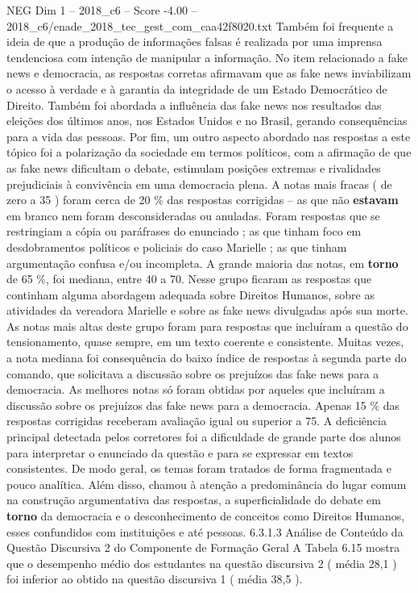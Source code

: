 \begin{textsample}{NEG Dim 1 – 2018\_c6 – Score -4.00 – 2018\_c6/enade\_2018\_tec\_gest\_com\_caa42f8020.txt}
Também foi frequente a ideia de que a produção de informações falsas é realizada por uma imprensa tendenciosa com intenção de manipular a informação.
No item relacionado a fake news e democracia, as respostas corretas afirmavam que as fake news inviabilizam o acesso à verdade e à garantia da integridade de um Estado Democrático de Direito.
Também foi abordada a influência das fake news nos resultados das eleições dos últimos anos, nos Estados Unidos e no Brasil, gerando consequências para a vida das pessoas.
Por fim, um outro aspecto abordado nas respostas a este tópico foi a polarização da sociedade em termos políticos, com a afirmação de que as fake news dificultam o debate, estimulam posições extremas e rivalidades prejudiciais à convivência em uma democracia plena.
A notas mais fracas ( de zero a 35 ) foram cerca de 20 \% das respostas corrigidas – as que não \textbf{estavam} em branco nem foram desconsideradas ou anuladas.
Foram respostas que se restringiam a cópia ou paráfrases do enunciado ; as que tinham foco em desdobramentos políticos e policiais do caso Marielle ; as que tinham argumentação confusa e/ou incompleta.
A grande maioria das notas, em \textbf{torno} de 65 \%, foi mediana, entre 40 a 70.
Nesse grupo ficaram as respostas que continham alguma abordagem adequada sobre Direitos Humanos, sobre as atividades da vereadora Marielle e sobre as fake news divulgadas após sua morte.
As notas mais altas deste grupo foram para respostas que incluíram a questão do tensionamento, quase sempre, em um texto coerente e consistente.
Muitas vezes, a nota mediana foi consequência do baixo índice de respostas à segunda parte do comando, que solicitava a discussão sobre os prejuízos das fake news para a democracia.
As melhores notas só foram obtidas por aqueles que incluíram a discussão sobre os prejuízos das fake news para a democracia.
Apenas 15 \% das respostas corrigidas receberam avaliação igual ou superior a 75.
A deficiência principal detectada pelos corretores foi a dificuldade de grande parte dos alunos para interpretar o enunciado da questão e para se expressar em textos consistentes.
De modo geral, os temas foram tratados de forma fragmentada e pouco analítica.
Além disso, chamou à atenção a predominância do lugar comum na construção argumentativa das respostas, a superficialidade do debate em \textbf{torno} da democracia e o desconhecimento de conceitos como Direitos Humanos, esses confundidos com instituições e até pessoas. 6.3.1.3 Análise de Conteúdo da Questão Discursiva 2 do Componente de Formação Geral A Tabela 6.15 mostra que o desempenho médio dos estudantes na questão discursiva 2 ( média 28,1 ) foi inferior ao obtido na questão discursiva 1 ( média 38,5 ).

\end{textsample}
